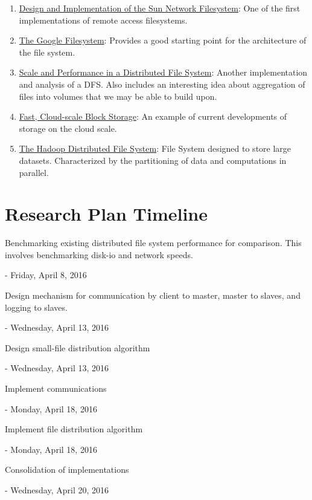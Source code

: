 \documentclass{article}
\begin{document}
\begin{enumerate}
\item \href{https://www.eecs.harvard.edu/cs261/papers/sandberg85.pdf}{Design and Implementation of the Sun Network Filesystem}: One of the first implementations of remote access filesystems. 
\item \href{http://www.cs.duke.edu/courses/spring16/compsci510/resources/papers/gfs-sosp2003.pdf}{The Google Filesystem}: Provides a good starting point for the architecture of the file system. 
\item \href{https://www.eecs.harvard.edu/cs261/papers/afs.pdf}{Scale and Performance in a Distributed File System}: Another implementation and analysis of a DFS. Also includes an interesting idea about aggregation of files into volumes that we may be able to build upon.
\item \href{https://www.eecs.harvard.edu/cs261/papers/sandberg85.pdf}{Fast, Cloud-scale Block Storage}: An example of current developments of storage on the cloud scale.
\item \href{http://storageconference.us/2010/Papers/MSST/Shvachko.pdf}{The Hadoop Distributed File System}: File System designed to store large datasets. Characterized by the partitioning of data and computations in parallel.
\end{enumerate}

\section{Research Plan Timeline}

Benchmarking existing distributed file system performance for comparison. This involves benchmarking disk-io and network speeds. 

- Friday, April 8, 2016

Design mechanism for communication by client to master, master to slaves, and logging to slaves. 

- Wednesday, April 13, 2016

Design small-file distribution algorithm

- Wednesday, April 13, 2016

Implement communications

- Monday, April 18, 2016

Implement file distribution algorithm

- Monday, April 18, 2016

Consolidation of implementations

- Wednesday, April 20, 2016
\end{document}
